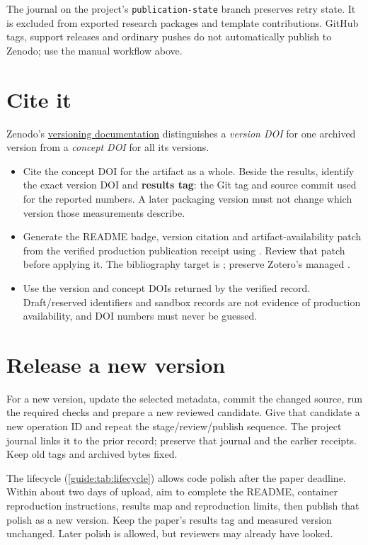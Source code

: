 The journal on the project's \texttt{publication-state} branch preserves retry state. It is excluded from exported research packages and template contributions. GitHub tags, support releases and ordinary pushes do not automatically publish to Zenodo; use the manual workflow above.

\section{Cite it}\label{guide:zenodo:cite}
Zenodo's \href{https://support.zenodo.org/help/en-gb/1-upload-deposit/97-what-is-doi-versioning}{versioning documentation} distinguishes a \emph{version DOI} for one archived version from a \emph{concept DOI} for all its versions.
\begin{itemize}
  \item Cite the concept DOI for the artifact as a whole. Beside the results, identify the exact version DOI and \textbf{results tag}: the Git tag and source commit used for the reported numbers. A later packaging version must not change which version those measurements describe.
  \item Generate the README badge, version citation and artifact-availability patch from the verified production publication receipt using . Review that patch before applying it. The bibliography target is ; preserve Zotero's managed .
  \item Use the version and concept DOIs returned by the verified record. Draft/reserved identifiers and sandbox records are not evidence of production availability, and DOI numbers must never be guessed.
\end{itemize}

\section{Release a new version}\label{guide:zenodo:versions}
For a new version, update the selected metadata, commit the changed source, run the required checks and prepare a new reviewed candidate. Give that candidate a new operation ID and repeat the stage/review/publish sequence. The project journal links it to the prior record; preserve that journal and the earlier receipts. Keep old tags and archived bytes fixed.

The lifecycle (\cref{guide:tab:lifecycle}) allows code polish after the paper deadline. Within about two days of upload, aim to complete the README, container reproduction instructions, results map and reproduction limits, then publish that polish as a new version. Keep the paper's results tag and measured version unchanged. Later polish is allowed, but reviewers may already have looked.
